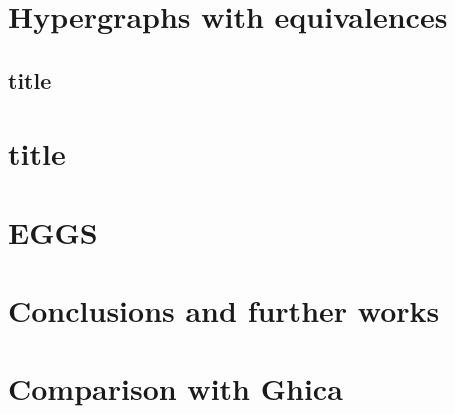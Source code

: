 \documentclass[runningheads,envcountsect]{llncs}
\begin{document}
\section{Hypergraphs with equivalences}

\subsection{title}

\section{title}

\section{EGGS}

\section{Conclusions and further works}


\appendix
\section{Comparison with Ghica}
\end{document}
